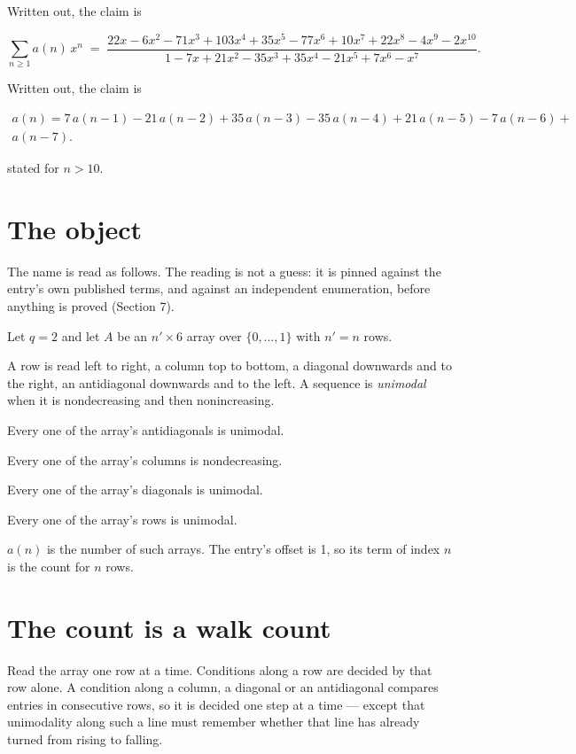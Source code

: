 \documentclass[11pt]{article}
\theoremstyle{definition}
\begin{document}
Written out, the claim is

\[\sum_{n \ge 1} a(n)\,x^n \;=\; \frac{22x - 6x^{2} - 71x^{3} + 103x^{4} + 35x^{5} - 77x^{6} + 10x^{7} + 22x^{8} - 4x^{9} - 2x^{10}}{1 - 7x + 21x^{2} - 35x^{3} + 35x^{4} - 21x^{5} + 7x^{6} - x^{7}}.\]

Written out, the claim is

\begin{multline*} a(n) = 7\,a(n-1) - 21\,a(n-2) + 35\,a(n-3) - 35\,a(n-4) + 21\,a(n-5) - 7\,a(n-6) + \\ a(n-7). \end{multline*}

stated for $n > 10$.

\section{The object}

The name is read as follows. The reading is not a guess: it is pinned against the entry's own published terms, and against an independent enumeration, before anything is proved (Section 7).

Let $q = 2$ and let $A$ be an $n' \times 6$ array over $\{0,\dots,1\}$ with $n' = n$ rows.

A row is read left to right, a column top to bottom, a diagonal downwards and to the right, an antidiagonal downwards and to the left. A sequence is {\itshape unimodal} when it is nondecreasing and then nonincreasing.

Every one of the array's antidiagonals is unimodal.

Every one of the array's columns is nondecreasing.

Every one of the array's diagonals is unimodal.

Every one of the array's rows is unimodal.

$a(n)$ is the number of such arrays. The entry's offset is 1, so its term of index $n$ is the count for $n$ rows.

\section{The count is a walk count}

Read the array one row at a time. Conditions along a row are decided by that row alone. A condition along a column, a diagonal or an antidiagonal compares entries in consecutive rows, so it is decided one step at a time --- except that unimodality along such a line must remember whether that line has already turned from rising to falling.
\end{document}
